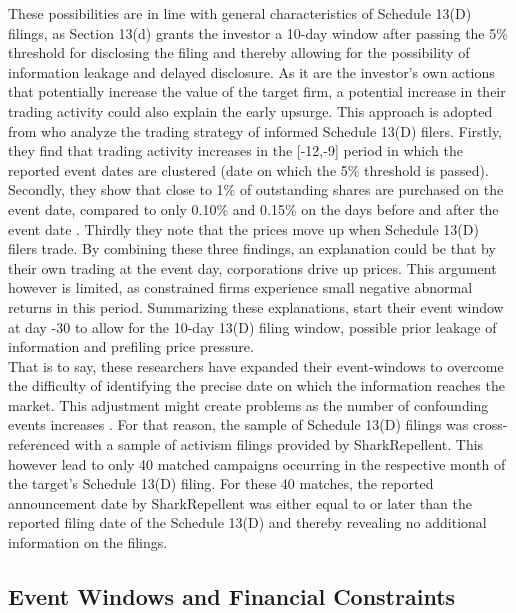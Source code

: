 \documentclass[12pt]{article}
\begin{document}
These possibilities are in line with general characteristics of Schedule 13(D) filings, as Section 13(d) grants the investor a 10-day window after passing the 5\% threshold for disclosing the filing and thereby allowing for the possibility of information leakage and delayed disclosure. 
As it are the investor's own actions that potentially increase the value of the target firm, a potential increase in their trading activity could also explain the early upsurge. This approach is adopted from  \citet[p.1561]{Collin-Dufresne2015} who analyze the trading strategy of informed Schedule 13(D) filers. Firstly, they find that trading activity increases in the [-12,-9] period in which the reported event dates are clustered (date on which the 5\% threshold is passed). Secondly, they show that close to 1\% of outstanding shares are purchased on the event date, compared to only 0.10\% and 0.15\% on the days before and after the event date \citep[p.1561]{Collin-Dufresne2015}. Thirdly they note that the prices move up when Schedule 13(D) filers trade. By combining these three findings, an explanation could be that by their own trading at the event day, corporations drive up prices. This argument however is limited, as constrained firms experience small negative abnormal returns in this period. Summarizing these explanations, \citet[p.207]{Klein2009} start their event window at day -30 to allow for the 10-day 13(D) filing window, possible prior leakage of information and prefiling price pressure.\\
That is to say, these researchers have expanded their event-windows to overcome the difficulty of identifying the precise date on which the information reaches the market. This adjustment might create problems as the number of confounding events increases \citep[p.352]{mcwilliams1999}. For that reason, the sample of Schedule 13(D) filings was cross-referenced with a sample of activism filings provided by SharkRepellent. This however lead to only 40 matched campaigns occurring in the respective month of the target's Schedule 13(D) filing. For these 40 matches, the reported announcement date by SharkRepellent was either equal to or later than the reported filing date of the Schedule 13(D) and thereby revealing no additional information on the filings.

\subsection{Event Windows and Financial Constraints}
\end{document}
